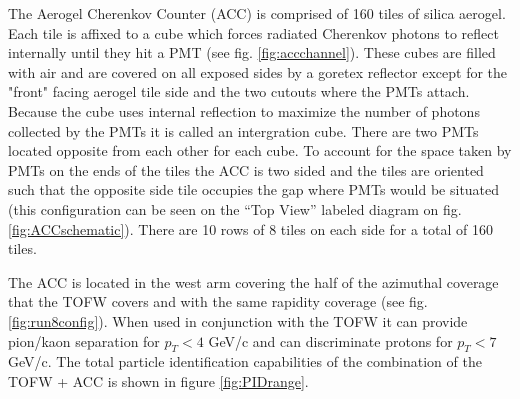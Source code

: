 The Aerogel Cherenkov Counter (ACC) is comprised of 160 tiles of silica aerogel. Each tile is affixed to a cube which forces radiated Cherenkov photons to reflect internally until they hit a PMT (see fig. \ref{fig:accchannel}). These cubes are filled with air and are covered on all exposed sides by a goretex reflector except for the "front" facing aerogel tile side and the two cutouts where the PMTs attach. Because the cube uses internal reflection to maximize the number of photons collected by the PMTs it is called an intergration cube. There are two PMTs located opposite from each other for each cube. To account for the space taken by PMTs on the ends of the tiles the ACC is two sided and the tiles are oriented such that the opposite side tile occupies the gap where PMTs would be situated (this configuration can be seen on the ``Top View'' labeled diagram on fig. \ref{fig:ACCschematic}). There are 10 rows of 8 tiles on each side for a total of 160 tiles.

The ACC is located in the west arm covering the half of the azimuthal coverage that the TOFW covers and with the same rapidity coverage (see fig. \ref{fig:run8config}). When used in conjunction with the TOFW it can provide pion/kaon separation for $p_{T} < 4$ GeV/c and can discriminate protons for $p_{T} < 7$ GeV/c.  The total particle identification capabilities of the combination of the TOFW + ACC is shown in figure \ref{fig:PIDrange}.

